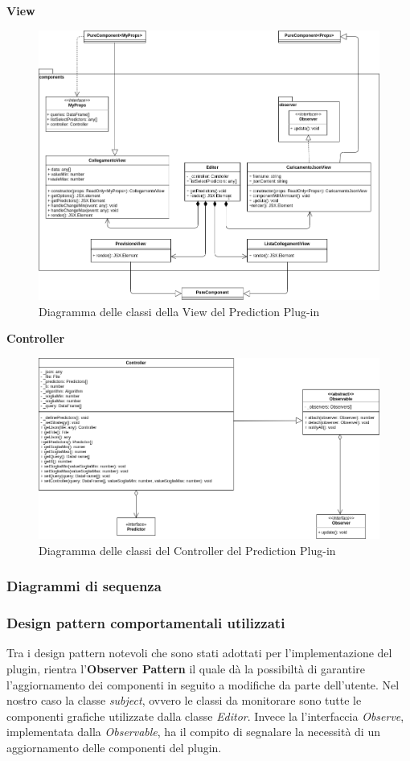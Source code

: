 \textbf{View}
\begin{figure}[H]
\centering
\includegraphics[scale=0.4]{../../Diagrams/Classes_diagrams/plugin_view.png}
\caption{Diagramma delle classi della View del Prediction Plug-in}
\end{figure}

\textbf{Controller}
\begin{figure}[H]
\centering
\includegraphics[scale=0.4]{../../Diagrams/Classes_diagrams/plugin_controller.png}
\caption{Diagramma delle classi del Controller del Prediction Plug-in}
\end{figure}

\subsubsection{Diagrammi di sequenza}

\subsubsection{Design pattern comportamentali utilizzati}
Tra i design pattern notevoli che sono stati adottati per l'implementazione del plugin, rientra l'\textbf{Observer Pattern} il quale dà la possibiltà di garantire l'aggiornamento dei componenti in seguito a modifiche da parte dell'utente.
Nel nostro caso la classe \textit{subject}, ovvero le classi da monitorare sono tutte le componenti grafiche utilizzate dalla classe \textit{Editor}. Invece la l'interfaccia \textit{Observe}, implementata dalla \textit{Observable}, ha il compito di segnalare la necessità di un aggiornamento delle componenti del plugin.

